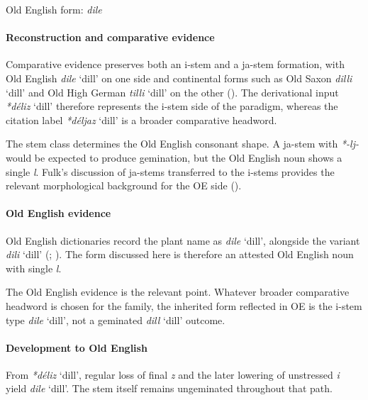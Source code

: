 \documentclass[
  british,
  a4paper,
]{article}
\providecommand{\Recon}[1]{\emph{*#1}}
\begin{document}
Old English form: \emph{dile}

\paragraph{Reconstruction and comparative
evidence}\label{reconstruction-and-comparative-evidence-94}

Comparative evidence preserves both an i-stem and a ja-stem formation,
with Old English {\emph{dile}} `dill' on one side and continental forms
such as Old Saxon {\emph{dilli}} `dill' and Old High German
{\emph{tilli}} `dill' on the other (). The derivational input \Recon{déliz} `dill' therefore represents
the i-stem side of the paradigm, whereas the citation label
\Recon{déljaz} `dill' is a broader comparative headword.

The stem class determines the Old English consonant shape. A ja-stem
with \emph{*-lj-} would be expected to produce gemination, but the Old
English noun shows a single \emph{l}. Fulk's discussion of ja-stems
transferred to the i-stems provides the relevant morphological
background for the OE side ().

\paragraph{Old English evidence}\label{old-english-evidence-96}

Old English dictionaries record the plant name as {\emph{dile}} `dill',
alongside the variant {\emph{dili}} `dill'
(;
). The form discussed
here is therefore an attested Old English noun with single \emph{l}.

The Old English evidence is the relevant point. Whatever broader
comparative headword is chosen for the family, the inherited form
reflected in OE is the i-stem type {\emph{dile}} `dill', not a geminated
{\emph{dill}} `dill' outcome.

\paragraph{Development to Old
English}\label{development-to-old-english-94}

From \Recon{déliz} `dill', regular loss of final \emph{z} and the later
lowering of unstressed \emph{i} yield {\emph{dile}} `dill'. The stem
itself remains ungeminated throughout that path.
\end{document}
